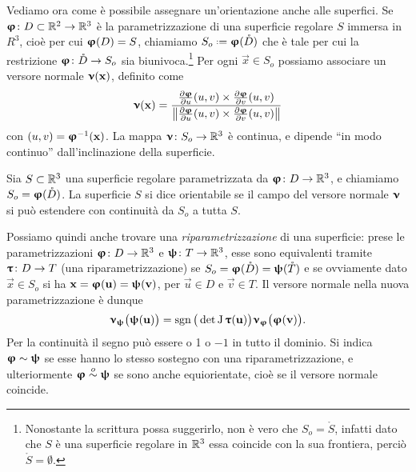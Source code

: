 Vediamo ora come è possibile assegnare un'orientazione anche alle superfici.
Se $\bm{\upvarphi}\colon D\subset\mathbb{R}^2\to\mathbb{R}^3$ è la parametrizzazione di una superficie regolare $S$ immersa in $R^3$, cioè per cui $\bm{\upvarphi}(D)=S$, chiamiamo $S_o\defeq\vphi(\mathring{D})$ che è tale per cui la restrizione $\bm{\upvarphi}\colon\mathring{D}\to S_o$ sia biunivoca.\footnote{Nonostante la scrittura possa suggerirlo, non è vero che $S_o=\mathring{S}$, infatti dato che $S$ è una superficie regolare in $\mathbb{R}^3$ essa coincide con la sua frontiera, perciò $\mathring{S}=\emptyset$.}
Per ogni $\vec x\in S_o$ possiamo associare un versore normale $\bm{\upnu}(\mathbf{x})$, definito come
\begin{equation}
	\bm{\upnu}(\mathbf{x})=\frac{\frac{\partial {\bm{\upvarphi}}}{\partial {u}}(u,v)\times\frac{\partial {\bm{\upvarphi}}}{\partial {v}}(u,v)}{\left\|{\frac{\partial {\bm{\upvarphi}}}{\partial {u}}(u,v)\times\frac{\partial {\bm{\upvarphi}}}{\partial {v}}(u,v)}\right\|}
\end{equation}
con $(u,v)=\bm{\upvarphi}^{-1}(\mathbf{x})$.
La mappa $\bm{\upnu}\colon S_o\to\mathbb{R}^3$ è continua, e dipende ``in modo continuo'' dall'inclinazione della superficie.
\begin{definizione} \label{d:superficie-orientabile}
	Sia $S\subset\mathbb{R}^3$ una superficie regolare parametrizzata da $\bm{\upvarphi}\colon D\to\mathbb{R}^3$, e chiamiamo $S_o=\bm{\upvarphi}(\mathring{D})$.
	La superficie $S$ si dice orientabile se il campo del versore normale $\bm{\upnu}$ si può estendere con continuità da $S_o$ a tutta $S$.
\end{definizione}
Possiamo quindi anche trovare una \emph{riparametrizzazione} di una superficie: prese le parametrizzazioni $\bm{\upvarphi}\colon D\to\mathbb{R}^3$ e $\bm{\uppsi}\colon T\to\mathbb{R}^3$, esse sono equivalenti tramite $\bm{\uptau}\colon D\to T$ (una riparametrizzazione) se $S_o=\bm{\upvarphi}(\mathring{D})=\bm{\uppsi}(\mathring{T})$ e se ovviamente dato $\vec x\in S_o$ si ha $\mathbf{x}=\bm{\upvarphi}(\mathbf{u})=\bm{\uppsi}(\mathbf{v})$, per $\vec u\in D$ e $\vec v\in T$.
Il versore normale nella nuova parametrizzazione è dunque
\begin{equation}
	\bm{\upnu}_{\bm{\uppsi}}\big(\bm{\uppsi}(\mathbf{u})\big)=\operatorname{sgn}\big(\det\operatorname{J}\bm{\uptau}(\mathbf{u})\big)\bm{\upnu}_{\bm{\upvarphi}}\big(\bm{\upvarphi}(\mathbf{v})\big).
\end{equation}
Per la continuità il segno può essere o 1 o $-1$ in tutto il dominio.
Si indica $\bm{\upvarphi}\sim\bm{\uppsi}$ se esse hanno lo stesso sostegno con una riparametrizzazione, e ulteriormente $\bm{\upvarphi}\overset{o}{\sim}\bm{\uppsi}$ se sono anche equiorientate, cioè se il versore normale coincide.

